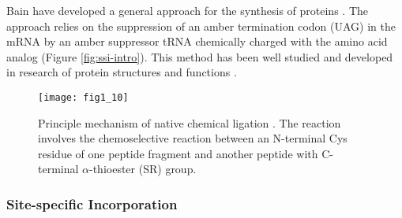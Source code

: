 \begin{refsection}
Bain  have developed a general
approach for the  synthesis of proteins \cite{Bain1991}.  The
approach relies on the suppression of an amber termination codon (UAG) in the
mRNA by an amber suppressor tRNA chemically charged with the amino acid analog
\cite{Theato2013} (Figure \ref{fig:ssi-intro}).  This method has been well
studied and developed in research of protein structures and functions
\cite{Martoglio1995,Eichler1997}.
\begin{figure}[h!] \centering \texttt{[image: fig1\_10]}
    \caption[Princilple mechanism of native chemical ligation. The reaction
    involves the chemoselective reaction between an N-terminal Cys residue of
one peptide fragment and another peptide with C-terminal $\alpha$-thioester
(SR) group.] {Principle mechanism of native chemical ligation \cite{Theato2013}.
The reaction involves the chemoselective reaction between an N-terminal Cys
residue of one peptide fragment and another peptide with C-terminal
$\alpha$-thioester (SR) group.} \label{fig:ncl-intro} 
\end{figure}

\subsubsection{ Site-specific Incorporation}


\end{refsection}

